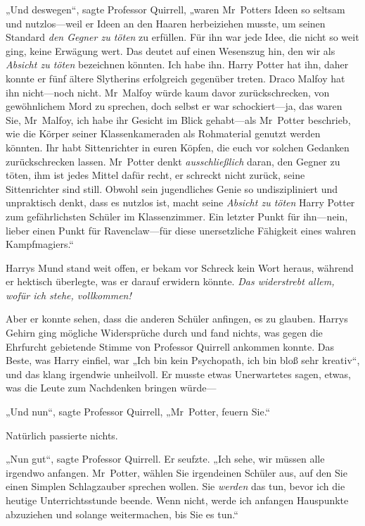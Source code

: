 {„Und deswegen“, sagte Professor Quirrell, „waren Mr~Potters Ideen so seltsam und nutzlos—weil er Ideen an den Haaren herbeiziehen musste, um seinen Standard \emph{den Gegner zu töten} zu erfüllen. Für ihn war jede Idee, die nicht so weit ging, keine Erwägung wert. Das deutet auf einen Wesenszug hin, den wir als \emph{Absicht zu töten} bezeichnen könnten. Ich habe ihn. Harry Potter hat ihn, daher konnte er fünf ältere Slytherins erfolgreich gegenüber treten. Draco Malfoy hat ihn nicht—noch nicht. Mr~Malfoy würde kaum davor zurückschrecken, von gewöhnlichem Mord zu sprechen, doch selbst er war schockiert—ja, das waren Sie, Mr~Malfoy, ich habe ihr Gesicht im Blick gehabt—als Mr~Potter beschrieb, wie die Körper seiner Klassenkameraden als Rohmaterial genutzt werden könnten. Ihr habt Sittenrichter in euren Köpfen, die euch vor solchen Gedanken zurückschrecken lassen. Mr~Potter denkt \emph{ausschließlich} daran, den Gegner zu töten, ihm ist jedes Mittel dafür recht, er schreckt nicht zurück, seine Sittenrichter sind still. Obwohl sein jugendliches Genie so undiszipliniert und unpraktisch denkt, dass es nutzlos ist, macht seine \emph{Absicht zu töten} Harry Potter zum gefährlichsten Schüler im Klassenzimmer. Ein letzter Punkt für ihn—nein, lieber einen Punkt für Ravenclaw—für diese unersetzliche Fähigkeit eines wahren Kampfmagiers.“

Harrys Mund stand weit offen, er bekam vor Schreck kein Wort heraus, während er hektisch überlegte, was er darauf erwidern könnte. \emph{Das widerstrebt allem, wofür ich stehe, vollkommen!}

Aber er konnte sehen, dass die anderen Schüler anfingen, es zu glauben. Harrys Gehirn ging mögliche Widersprüche durch und fand nichts, was gegen die Ehrfurcht gebietende Stimme von Professor Quirrell ankommen konnte. Das Beste, was Harry einfiel, war „Ich bin kein Psychopath, ich bin bloß sehr kreativ“, und das klang irgendwie unheilvoll. Er musste etwas Unerwartetes sagen, etwas, was die Leute zum Nachdenken bringen würde—

„Und nun“, sagte Professor Quirrell, „Mr~Potter, feuern Sie.“

Natürlich passierte nichts.

„Nun gut“, sagte Professor Quirrell. Er seufzte. „Ich sehe, wir müssen alle irgendwo anfangen. Mr~Potter, wählen Sie irgendeinen Schüler aus, auf den Sie einen Simplen Schlagzauber sprechen wollen. Sie \emph{werden} das tun, bevor ich die heutige Unterrichtsstunde beende. Wenn nicht, werde ich anfangen Hauspunkte abzuziehen und solange weitermachen, bis Sie es tun.“

}
